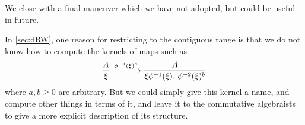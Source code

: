 We close with a final maneuver which we have not adopted, but could be useful in future.

\begin{notation} In \sec\ref{sec:dRW}, one reason for restricting to the contiguous range is that we do not know how to compute the kernels of maps such as
  \[ \frac A\xi \xrightarrow{\phi^{-1}(\xi)^a} \frac A{\xi\phi^{-1}(\xi),\, \phi^{-2}(\xi)^b} \]
  where $a,b\ge0$ are arbitrary. But we could simply give this kernel a name, and compute other things in terms of it, and leave it to the commutative algebraists to give a more explicit description of its structure.
\end{notation}
